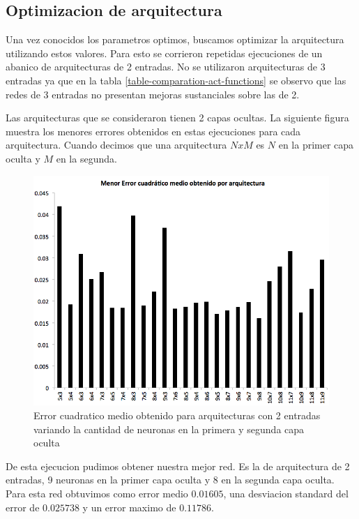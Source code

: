 \documentclass[a4paper,10pt]{article}
\begin{document}
    \subsection{Optimizacion de arquitectura}
    \label{sec:arquitectura-optima}

    Una vez conocidos los parametros optimos, buscamos optimizar la arquitectura utilizando estos valores.
    Para esto se corrieron repetidas ejecuciones de un abanico de arquitecturas de 2 entradas.
    No se utilizaron arquitecturas de 3 entradas ya que en la tabla \ref{table-comparation-act-functions} se observo que las redes de 3 entradas no presentan mejoras sustanciales sobre las de 2.

    Las arquitecturas que se consideraron tienen 2 capas ocultas.
    La siguiente figura muestra los menores errores obtenidos en estas ejecuciones para cada arquitectura.
    Cuando decimos que una arquitectura $NxM$ es $N$ en la primer capa oculta y $M$ en la segunda.

    \begin{figure}[H]
        \includegraphics[scale=0.5]{./images/arquitecturas.png}
        \caption{Error cuadratico medio obtenido para arquitecturas con 2 entradas variando la cantidad de neuronas en la primera y segunda capa oculta}
        \label{fig:arquitecturas}
    \end{figure}

    De esta ejecucion pudimos obtener nuestra mejor red.
    Es la de arquitectura de 2 entradas, 9 neuronas en la primer capa oculta y 8 en la segunda capa oculta.
    Para esta red obtuvimos como error medio $0.01605$, una desviacion standard del error de $0.025738$ y un error maximo de $0.11786$.


\end{document}
